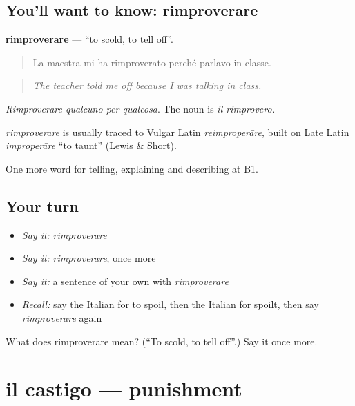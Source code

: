 \subsection*{You'll want to know: rimproverare}
\textbf{rimproverare} — \textquotedblleft{}to scold, to tell off\textquotedblright{}.

\begin{quote}
La maestra mi ha rimproverato perché parlavo in classe.
\end{quote}

\begin{quote}
\emph{The teacher told me off because I was talking in class.}
\end{quote}

\emph{Rimproverare qualcuno per qualcosa}. The noun is \emph{il rimprovero}.

\begin{cousinweb}
\emph{rimproverare} is usually traced to Vulgar Latin \emph{reimproperāre}, built on Late Latin \emph{improperāre} \textquotedblleft{}to taunt\textquotedblright{} (Lewis \& Short).
\end{cousinweb}

\begin{grammarlens}[title={What you've built}]
One more word for telling, explaining and describing at B1.
\end{grammarlens}

\subsection*{Your turn}
\begin{itemize}
\raggedright
  \item \emph{Say it:} \emph{rimproverare}
  \item \emph{Say it:} \emph{rimproverare}, once more
  \item \emph{Say it:} a sentence of your own with \emph{rimproverare}
  \item \emph{Recall:} say the Italian for to spoil, then the Italian for spoilt, then say \emph{rimproverare} again
\end{itemize}

\begin{tcolorbox}[breakable,colback=teal!4,colframe=teal!35!black,title={Before you move on}]
What does rimproverare mean? (\textquotedblleft{}To scold, to tell off\textquotedblright{}.) Say it once more.
\end{tcolorbox}
\section[il castigo]{il castigo — punishment}

